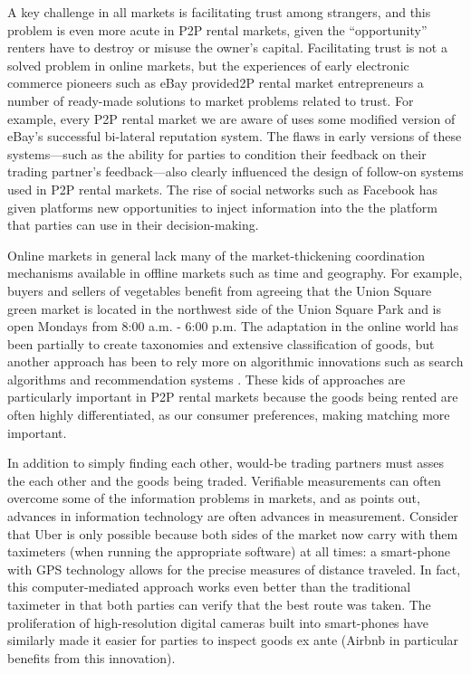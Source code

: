 \documentclass[11pt]{article}
\begin{document}
A key challenge in all markets is facilitating trust among strangers, and this problem is even more acute in P2P rental markets, given the ``opportunity'' renters have to destroy or misuse the owner's capital.  
Facilitating trust is not a solved problem in online markets, but the experiences of early electronic commerce pioneers such as eBay provided2P rental market entrepreneurs a number of ready-made solutions to market problems related to trust. 
For example, every P2P rental market we are aware of uses some modified version of eBay's successful bi-lateral reputation system. 
The flaws in early versions of these systems---such as the ability for parties to condition their feedback on their trading partner's feedback---also clearly influenced the design of follow-on systems used in P2P rental markets. 
The rise of social networks such as Facebook has given platforms new opportunities to inject information into the the platform that parties can use in their decision-making. 

Online markets in general lack many of the market-thickening coordination mechanisms available in offline markets such as time and geography.
For example, buyers and sellers of vegetables benefit from agreeing that the Union Square green market is located in the northwest side of the Union Square Park and is open Mondays from 8:00 a.m. - 6:00 p.m.
The adaptation in the online world has been partially to create taxonomies and extensive classification of goods, but another approach has been to rely more on algorithmic innovations such as search algorithms and recommendation systems \citep{resnick1997recommender, adomavicius2005toward}.
These kids of approaches are particularly important in P2P rental markets because the goods being rented are often highly differentiated, as our consumer preferences, making matching more important. 

In addition to simply finding each other, would-be trading partners must asses the each other and the goods being traded. 
Verifiable measurements can often overcome some of the information problems in markets, and as \cite{varian2010computer} points out, advances in information technology are often advances in measurement. 
Consider that Uber is only possible because both sides of the market now carry with them taximeters (when running the appropriate software) at all times: 
a smart-phone with GPS technology allows for the precise measures of distance traveled.
In fact, this computer-mediated approach works even better than the traditional taximeter in that both parties can verify that the best route was taken. 
The proliferation of high-resolution digital cameras built into smart-phones have similarly made it easier for parties to inspect goods ex ante (Airbnb in particular benefits from this innovation).  
 
\end{document}
